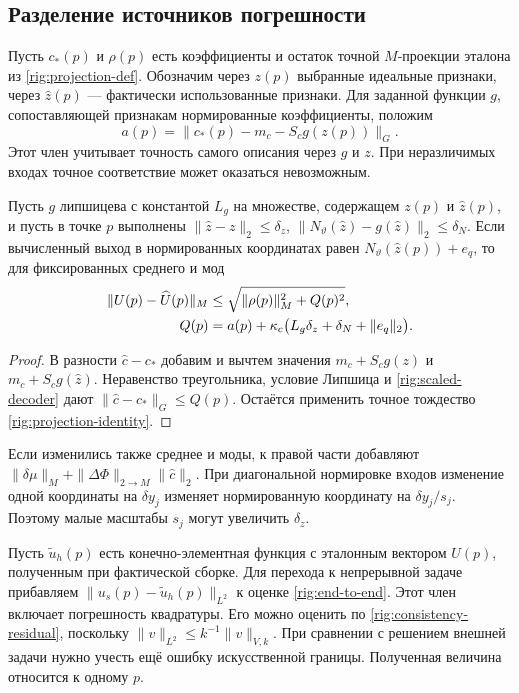 \subsection{Разделение источников погрешности}
Пусть $c_*(p)$ и $\rho(p)$ есть коэффициенты и остаток точной $M$-проекции
эталона из \eqref{rig:projection-def}. Обозначим через $z(p)$ выбранные
идеальные признаки, через $\widehat z(p)$ --- фактически использованные
признаки. Для заданной функции $g$, сопоставляющей признакам нормированные
коэффициенты, положим
\begin{equation}
 a(p)=\|c_*(p)-m_c-S_c g(z(p))\|_G.\label{rig:representation-defect}
\end{equation}
Этот член учитывает точность самого описания через $g$ и $z$. При
неразличимых входах точное соответствие может оказаться невозможным.

\begin{proposition}
Пусть $g$ липшицева с константой $L_g$ на множестве, содержащем
$z(p)$ и $\widehat z(p)$, и пусть в точке $p$ выполнены
$\|\widehat z-z\|_2\le\delta_z$,
$\|N_\vartheta(\widehat z)-g(\widehat z)\|_2\le\delta_N$.
Если вычисленный выход в нормированных координатах равен
$N_\vartheta(\widehat z(p))+e_q$, то для фиксированных среднего и мод
\begin{align}
 \|U(p)-\widehat U(p)\|_M
 &\le\sqrt{\|\rho(p)\|_M^2+Q(p)^2},\label{rig:end-to-end}\\
 Q(p)&=a(p)+\kappa_c\bigl(L_g\delta_z+\delta_N+\|e_q\|_2\bigr).\notag
\end{align}
\end{proposition}
\begin{proof}
В разности $\widehat c-c_*$ добавим и вычтем значения
$m_c+S_c g(z)$ и $m_c+S_c g(\widehat z)$. Неравенство треугольника,
условие Липшица и \eqref{rig:scaled-decoder} дают
$\|\widehat c-c_*\|_G\le Q(p)$. Остаётся применить точное тождество
\eqref{rig:projection-identity}.
\end{proof}
Если изменились также среднее и моды, к правой части добавляют
$\|\delta\mu\|_M+\|\Delta\Phi\|_{2\to M}\|\widehat c\|_2$. При
диагональной нормировке входов изменение одной координаты на $\delta y_j$
изменяет нормированную координату на $\delta y_j/s_j$. Поэтому малые
масштабы $s_j$ могут увеличить $\delta_z$.

Пусть $\widetilde u_h(p)$ есть конечно-элементная функция с эталонным
вектором $U(p)$, полученным при фактической сборке. Для перехода к
непрерывной задаче прибавляем $\|u_s(p)-\widetilde u_h(p)\|_{L^2}$
к оценке \eqref{rig:end-to-end}. Этот член включает погрешность
квадратуры. Его можно оценить по \eqref{rig:consistency-residual},
поскольку $\|v\|_{L^2}\le k^{-1}\|v\|_{V,k}$.
При сравнении с решением внешней задачи нужно учесть ещё ошибку
искусственной границы. Полученная величина относится к одному $p$.

